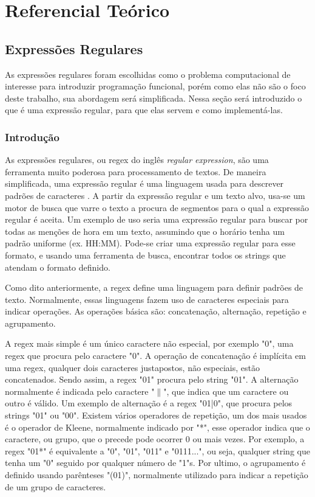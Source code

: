 \section{Referencial Teórico}

\subsection{Expressões Regulares}
As expressões regulares foram escolhidas como o problema computacional de interesse para introduzir programação funcional, porém como elas não são o foco deste trabalho, sua abordagem será simplificada.
Nessa seção será introduzido o que é uma expressão regular, para que elas servem e como implementá-las.

\subsubsection{Introdução}
As expressões regulares, ou regex do inglês \emph{regular expression}, são uma ferramenta muito poderosa para processamento de textos.
De maneira simplificada, uma expressão regular é uma linguagem usada para descrever padrões de caracteres \cite{mastering}.
A partir da expressão regular e um texto alvo, usa-se um motor de busca que varre o texto a procura de segmentos para o qual a expressão regular é aceita.
Um exemplo de uso seria uma expressão regular para buscar por todas as menções de hora em um texto, assumindo que o horário tenha um padrão uniforme (ex. HH:MM).
Pode-se criar uma expressão regular para esse formato, e usando uma ferramenta de busca, encontrar todos os strings que atendam o formato definido.

Como dito anteriormente, a regex define uma linguagem para definir padrões de texto.
Normalmente, essas linguagens fazem uso de caracteres especiais para indicar operações.
As operações básica são: concatenação, alternação, repetição e agrupamento.

A regex mais simple é um único caractere não especial, por exemplo "0", uma regex que procura pelo caractere "0".
A operação de concatenação é implícita em uma regex, qualquer dois caracteres justapostos, não especiais, estão concatenados.
Sendo assim, a regex "01" procura pelo string "01".
A alternação normalmente é indicada pelo caractere "$\|$", que indica que um caractere ou outro é válido.
Um exemplo de alternação é a regex "01|0", que procura pelos strings "01" ou "00".
Existem vários operadores de repetição, um dos mais usados é o operador de Kleene, normalmente indicado por "*", esse operador indica que o caractere, ou grupo, que o precede pode ocorrer 0 ou mais vezes.
Por exemplo, a regex "01*" é equivalente a "0", "01", "011" e "0111...", ou seja, qualquer string que tenha um "0" seguido por qualquer número de "1"s.
Por ultimo, o agrupamento é definido usando parênteses "(01)", normalmente utilizado para indicar a repetição de um grupo de caracteres\cite{mastering}.

